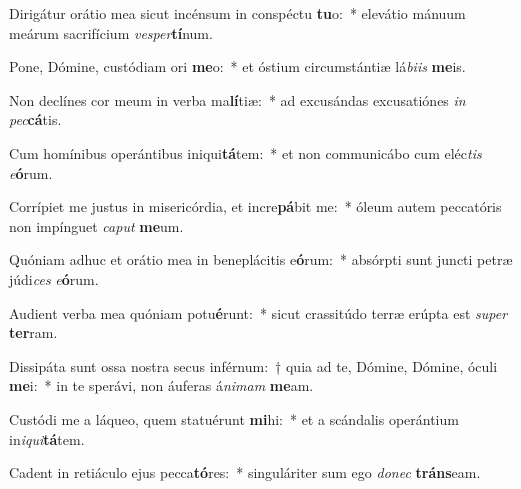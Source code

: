 \item Dirigátur orátio mea sicut incénsum in conspéctu \textbf{tu}o:~* elevátio mánuum meárum sacrifícium \textit{ves}\textit{per}\textbf{tí}num.
\item Pone, Dómine, custódiam ori \textbf{me}o:~* et óstium circumstántiæ lá\textit{bi}\textit{is} \textbf{me}is.
\item Non declínes cor meum in verba ma\textbf{lí}tiæ:~* ad excusándas excusatiónes \textit{in} \textit{pec}\textbf{cá}tis.
\item Cum homínibus operántibus iniqui\textbf{tá}tem:~* et non communicábo cum eléc\textit{tis} \textit{e}\textbf{ó}rum.
\item Corrípiet me justus in misericórdia, et incre\textbf{pá}bit me:~* óleum autem peccatóris non impínguet \textit{ca}\textit{put} \textbf{me}um.
\item Quóniam adhuc et orátio mea in beneplácitis e\textbf{ó}rum:~* absórpti sunt juncti petræ júdi\textit{ces} \textit{e}\textbf{ó}rum.
\item Audient verba mea quóniam potu\textbf{é}runt:~* sicut crassitúdo terræ erúpta est \textit{su}\textit{per} \textbf{ter}ram.
\item Dissipáta sunt ossa nostra secus inférnum:~† quia ad te, Dómine, Dómine, óculi \textbf{me}i:~* in te sperávi, non áuferas á\textit{ni}\textit{mam} \textbf{me}am.
\item Custódi me a láqueo, quem statuérunt \textbf{mi}hi:~* et a scándalis operántium in\textit{i}\textit{qui}\textbf{tá}tem.
\item Cadent in retiáculo ejus pecca\textbf{tó}res:~* singuláriter sum ego \textit{do}\textit{nec} \textbf{tráns}eam.
